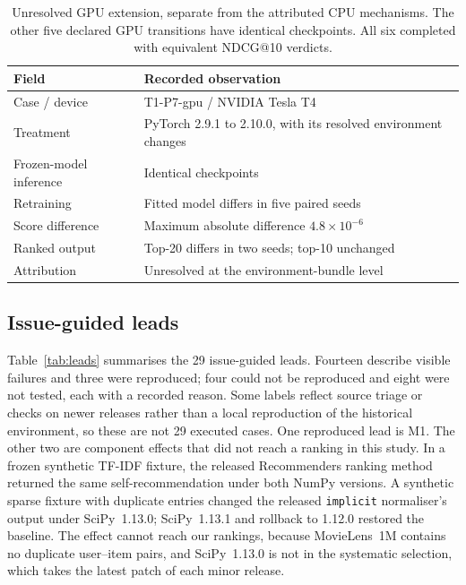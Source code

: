 \documentclass[11pt,a4paper]{article}
\begin{document}
\begin{table}[htbp]
  \centering\small
  \caption{Unresolved GPU extension, separate from the attributed CPU
    mechanisms. The other five declared GPU transitions have identical
    checkpoints. All six completed with equivalent NDCG@10 verdicts.}
  \label{tab:gpu}
  \begin{tabularx}{\textwidth}{@{}lX@{}}
    \toprule
    Field & Recorded observation \\
    \midrule
    Case / device & T1-P7-gpu / NVIDIA Tesla T4 \\
    Treatment & PyTorch 2.9.1 to 2.10.0, with its resolved environment changes \\
    Frozen-model inference & Identical checkpoints \\
    Retraining & Fitted model differs in five paired seeds \\
    Score difference & Maximum absolute difference $4.8\times10^{-6}$ \\
    Ranked output & Top-20 differs in two seeds; top-10 unchanged \\
    Attribution & Unresolved at the environment-bundle level \\
    \bottomrule
  \end{tabularx}
\end{table}

\subsection{Issue-guided leads}

Table~\ref{tab:leads} summarises the 29 issue-guided leads. Fourteen describe
visible failures and three were reproduced; four could not be reproduced and
eight were not tested, each with a recorded reason. Some labels reflect source
triage or checks on newer releases rather than a local reproduction of the
historical environment, so these are not 29 executed cases. One reproduced
lead is M1. The other two are component effects that did not reach a ranking
in this study. In a frozen synthetic TF-IDF fixture, the released Recommenders
ranking method returned the same self-recommendation under both NumPy
versions. A synthetic sparse fixture with duplicate entries changed the
released \texttt{implicit} normaliser's output under SciPy~1.13.0; SciPy~1.13.1
and rollback to 1.12.0 restored the baseline. The effect cannot reach our
rankings, because MovieLens~1M contains no duplicate user--item pairs, and
SciPy~1.13.0 is not in the systematic selection, which takes the latest patch
of each minor release.
\end{document}
